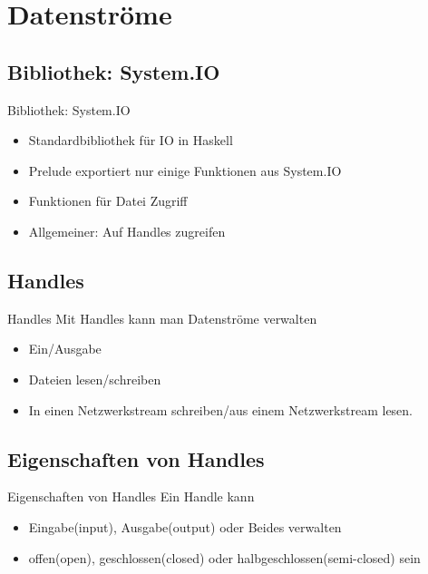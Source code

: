 \documentclass{beamer}
\begin{document}
\section{Datenströme}
\subsection{Bibliothek: System.IO}
\begin{frame}{Bibliothek: System.IO}
\begin{itemize}
\item Standardbibliothek für IO in Haskell
\item Prelude exportiert nur einige Funktionen aus System.IO
\item Funktionen für Datei Zugriff
\item Allgemeiner: Auf Handles zugreifen
\end{itemize}
\end{frame}

\subsection{Handles}
\begin{frame}[<+->]{Handles}
Mit Handles kann man Datenströme verwalten
\begin{itemize}
\item Ein/Ausgabe
\item Dateien lesen/schreiben
\item In einen Netzwerkstream schreiben/aus einem Netzwerkstream lesen.
\end{itemize}
\end{frame}

\subsection{Eigenschaften von Handles}
\begin{frame}[<+->]{Eigenschaften von Handles}
Ein Handle kann
\begin{itemize}
\item Eingabe(input), Ausgabe(output) oder Beides verwalten
\item offen(open), geschlossen(closed) oder halbgeschlossen(semi-closed) sein
\end{itemize}
\end{frame}
\end{document}
